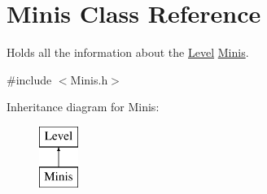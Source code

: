 \hypertarget{class_minis}{}\section{Minis Class Reference}
\label{class_minis}


Holds all the information about the \hyperlink{class_level}{Level} \hyperlink{class_minis}{Minis}.  




{\ttfamily \#include $<$Minis.\+h$>$}

Inheritance diagram for Minis\+:\begin{figure}[H]
\begin{center}
\leavevmode
\includegraphics[height=2.000000cm]{class_minis}
\end{center}
\end{figure}
